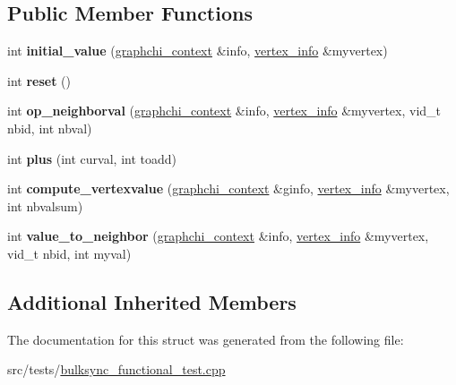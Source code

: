 \subsection*{Public Member Functions}
\begin{DoxyCompactItemize}
\item 
\hypertarget{structsmoketest__program_acb582a99fa69ac88aaa313a20a2c314d}{int {\bfseries initial\-\_\-value} (\hyperlink{structgraphchi_1_1graphchi__context}{graphchi\-\_\-context} \&info, \hyperlink{structgraphchi_1_1vertex__info}{vertex\-\_\-info} \&myvertex)}\label{structsmoketest__program_acb582a99fa69ac88aaa313a20a2c314d}

\item 
\hypertarget{structsmoketest__program_ac47d83f5770d0ec72564cc62fc7d1d15}{int {\bfseries reset} ()}\label{structsmoketest__program_ac47d83f5770d0ec72564cc62fc7d1d15}

\item 
\hypertarget{structsmoketest__program_a3070fe1597ee025bda42a7b267dcf7a9}{int {\bfseries op\-\_\-neighborval} (\hyperlink{structgraphchi_1_1graphchi__context}{graphchi\-\_\-context} \&info, \hyperlink{structgraphchi_1_1vertex__info}{vertex\-\_\-info} \&myvertex, vid\-\_\-t nbid, int nbval)}\label{structsmoketest__program_a3070fe1597ee025bda42a7b267dcf7a9}

\item 
\hypertarget{structsmoketest__program_a58cf0d408d898777245c416973fb5544}{int {\bfseries plus} (int curval, int toadd)}\label{structsmoketest__program_a58cf0d408d898777245c416973fb5544}

\item 
\hypertarget{structsmoketest__program_a28d5215603dae9bcee99b46ee9688196}{int {\bfseries compute\-\_\-vertexvalue} (\hyperlink{structgraphchi_1_1graphchi__context}{graphchi\-\_\-context} \&ginfo, \hyperlink{structgraphchi_1_1vertex__info}{vertex\-\_\-info} \&myvertex, int nbvalsum)}\label{structsmoketest__program_a28d5215603dae9bcee99b46ee9688196}

\item 
\hypertarget{structsmoketest__program_abc937e7c50885e8c9f17c5f9bf6e477e}{int {\bfseries value\-\_\-to\-\_\-neighbor} (\hyperlink{structgraphchi_1_1graphchi__context}{graphchi\-\_\-context} \&info, \hyperlink{structgraphchi_1_1vertex__info}{vertex\-\_\-info} \&myvertex, vid\-\_\-t nbid, int myval)}\label{structsmoketest__program_abc937e7c50885e8c9f17c5f9bf6e477e}

\end{DoxyCompactItemize}
\subsection*{Additional Inherited Members}


The documentation for this struct was generated from the following file\-:\begin{DoxyCompactItemize}
\item 
src/tests/\hyperlink{bulksync__functional__test_8cpp}{bulksync\-\_\-functional\-\_\-test.\-cpp}\end{DoxyCompactItemize}
